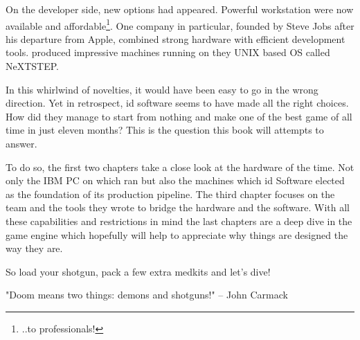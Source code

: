  \par
 On the developer side, new options had appeared. Powerful workstation were now available and affordable\footnote{..to professionals!}. One company in particular, founded by Steve Jobs after his departure from Apple, combined strong hardware with efficient development tools. \NeXT produced impressive machines running on they UNIX based OS called NeXTSTEP.\\%
 \par
 In this whirlwind of novelties, it would have been easy to go in the wrong direction. Yet in retrospect, id software seems to have made all the right choices. How did they manage to start from nothing and make one of the best game of all time in just eleven months? This is the question this book will attempts to answer.\\
 \par
 To do so, the first two chapters take a close look at the hardware of the time. Not only the IBM PC on which \doom ran but also the \NeXT machines which id Software elected as the foundation of its production pipeline. The third chapter focuses on the team and the tools they wrote to bridge the hardware and the software. With all these capabilities and restrictions in mind the last chapters are a deep dive in the game engine which hopefully will help to appreciate why things are designed the way they are.\\
\par
So load your shotgun, pack a few extra medkits and let's dive!\\
\par
\centering "Doom means two things: demons and shotguns!" -- John Carmack

